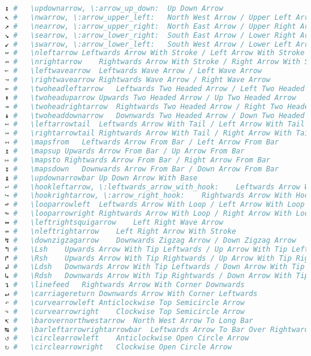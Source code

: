 \begin{lstlisting}[language=Julia, linewidth=\textwidth]
↕ #   \updownarrow, \:arrow_up_down:  Up Down Arrow
↖ #   \nwarrow, \:arrow_upper_left:   North West Arrow / Upper Left Arrow
↗ #   \nearrow, \:arrow_upper_right:  North East Arrow / Upper Right Arrow
↘ #   \searrow, \:arrow_lower_right:  South East Arrow / Lower Right Arrow
↙ #   \swarrow, \:arrow_lower_left:   South West Arrow / Lower Left Arrow
↚ #   \nleftarrow Leftwards Arrow With Stroke / Left Arrow With Stroke
↛ #   \nrightarrow    Rightwards Arrow With Stroke / Right Arrow With Stroke
↜ #   \leftwavearrow  Leftwards Wave Arrow / Left Wave Arrow
↝ #   \rightwavearrow Rightwards Wave Arrow / Right Wave Arrow
↞ #   \twoheadleftarrow   Leftwards Two Headed Arrow / Left Two Headed Arrow
↟ #   \twoheaduparrow Upwards Two Headed Arrow / Up Two Headed Arrow
↠ #   \twoheadrightarrow  Rightwards Two Headed Arrow / Right Two Headed Arrow
↡ #   \twoheaddownarrow   Downwards Two Headed Arrow / Down Two Headed Arrow
↢ #   \leftarrowtail  Leftwards Arrow With Tail / Left Arrow With Tail
↣ #   \rightarrowtail Rightwards Arrow With Tail / Right Arrow With Tail
↤ #   \mapsfrom   Leftwards Arrow From Bar / Left Arrow From Bar
↥ #   \mapsup Upwards Arrow From Bar / Up Arrow From Bar
↦ #   \mapsto Rightwards Arrow From Bar / Right Arrow From Bar
↧ #   \mapsdown   Downwards Arrow From Bar / Down Arrow From Bar
↨ #   \updownarrowbar Up Down Arrow With Base
↩ #   \hookleftarrow, \:leftwards_arrow_with_hook:    Leftwards Arrow With Hook
↪ #   \hookrightarrow, \:arrow_right_hook:    Rightwards Arrow With Hook
↫ #   \looparrowleft  Leftwards Arrow With Loop / Left Arrow With Loop
↬ #   \looparrowright Rightwards Arrow With Loop / Right Arrow With Loop
↭ #   \leftrightsquigarrow    Left Right Wave Arrow
↮ #   \nleftrightarrow    Left Right Arrow With Stroke
↯ #   \downzigzagarrow    Downwards Zigzag Arrow / Down Zigzag Arrow
↰ #   \Lsh    Upwards Arrow With Tip Leftwards / Up Arrow With Tip Left
↱ #   \Rsh    Upwards Arrow With Tip Rightwards / Up Arrow With Tip Right
↲ #   \Ldsh   Downwards Arrow With Tip Leftwards / Down Arrow With Tip Left
↳ #   \Rdsh   Downwards Arrow With Tip Rightwards / Down Arrow With Tip Right
↴ #   \linefeed   Rightwards Arrow With Corner Downwards
↵ #   \carriagereturn Downwards Arrow With Corner Leftwards
↶ #   \curvearrowleft Anticlockwise Top Semicircle Arrow
↷ #   \curvearrowright    Clockwise Top Semicircle Arrow
↸ #   \barovernorthwestarrow  North West Arrow To Long Bar
↹ #   \barleftarrowrightarrowbar  Leftwards Arrow To Bar Over Rightwards Arrow Bar
↺ #   \circlearrowleft    Anticlockwise Open Circle Arrow
↻ #   \circlearrowright   Clockwise Open Circle Arrow

\end{lstlisting}

